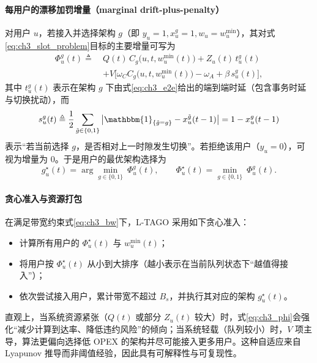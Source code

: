 \documentclass[type=master]{fduthesis}
\begin{document}
\paragraph{每用户的漂移加罚增量（marginal drift-plus-penalty）}
对用户 $u$，若接入并选择架构 $g$（即 $y_u=1,x_u^g=1,w_u=w_u^{\min}$），其对式\eqref{eq:ch3_slot_problem}目标的主要增量可写为
\begin{align}
\Phi_u^g(t)
\triangleq\ &
Q(t)\,C_g\big(u,t,w_u^{\min}(t)\big)
+ Z_u(t)\,t_u^g(t)
\nonumber\\
&+V\Big[
\omega_C C_g\big(u,t,w_u^{\min}(t)\big)-\omega_A
+\beta\, s_u^g(t)
\Big],
\label{eq:ch3_phi}
\end{align}
其中 $t_u^g(t)$ 表示在架构 $g$ 下由式\eqref{eq:ch3_e2e}给出的端到端时延（包含事务时延与切换扰动），而
\begin{equation}
s_u^g(t)\triangleq \frac12\sum_{\tilde g\in\{0,1\}}\big|\mathbbm{1}_{\{\tilde g=g\}}-x_u^{\tilde g}(t-1)\big|
=
1-x_u^{g}(t-1)
\label{eq:ch3_switch_indicator_given_g}
\end{equation}
表示“若当前选择 $g$，是否相对上一时隙发生切换”。若拒绝该用户（$y_u=0$），可视为增量为 0。于是用户的最优架构选择为
\begin{equation}
g_u^\star(t)=\arg\min_{g\in\{0,1\}}\ \Phi_u^g(t),
\qquad
\Phi_u^\star(t)=\min_{g\in\{0,1\}}\ \Phi_u^g(t).
\label{eq:ch3_best_g}
\end{equation}

\paragraph{贪心准入与资源打包}
在满足带宽约束式\eqref{eq:ch3_bw}下，L-TAGO 采用如下贪心准入：
\begin{itemize}
  \item 计算所有用户的 $\Phi_u^\star(t)$ 与 $w_u^{\min}(t)$；
  \item 将用户按 $\Phi_u^\star(t)$ 从小到大排序（越小表示在当前队列状态下“越值得接入”）；
  \item 依次尝试接入用户，累计带宽不超过 $B_s$，并执行其对应的架构 $g_u^\star(t)$。
\end{itemize}

直观上，当系统资源紧张（$Q(t)$ 或部分 $Z_u(t)$ 较大）时，式\eqref{eq:ch3_phi}会强化“减少计算到达率、降低违约风险”的倾向；当系统轻载（队列较小）时，$V$ 项主导，算法更偏向选择低 OPEX 的架构并尽可能接入更多用户。这种自适应来自 Lyapunov 推导而非阈值经验，因此具有可解释性与可复现性。
\end{document}
